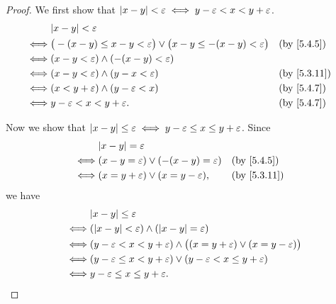 \begin{proof}
  We first show that \(\left\lvert x - y\right\rvert < \varepsilon \iff y - \varepsilon < x < y + \varepsilon\).
  \begin{align*}
         & \abs{x - y} < \varepsilon                                                                                     \\
    \iff & \big(-(x - y) \leq x - y < \varepsilon\big) \lor \big(x - y \leq -(x - y) < \varepsilon\big) &  & \by{5.4.5}  \\
    \iff & (x - y < \varepsilon) \land (-(x - y) < \varepsilon)                                                          \\
    \iff & (x - y < \varepsilon) \land (y - x < \varepsilon)                                            &  & \by{5.3.11} \\
    \iff & (x < y + \varepsilon) \land (y - \varepsilon < x)                                            &  & \by{5.4.7}  \\
    \iff & y - \varepsilon < x < y + \varepsilon.                                                       &  & \by{5.4.7}
  \end{align*}

  Now we show that \(\left\lvert x - y\right\rvert \leq \varepsilon \iff y - \varepsilon \leq x \leq y + \varepsilon\).
  Since
  \begin{align*}
         & \abs{x - y} = \varepsilon                                            \\
    \iff & (x - y = \varepsilon) \lor (-(x - y) = \varepsilon) &  & \by{5.4.5}  \\
    \iff & (x = y + \varepsilon) \lor (x = y - \varepsilon),   &  & \by{5.3.11}
  \end{align*}
  we have
  \begin{align*}
         & \abs{x - y} \leq \varepsilon                                                                             \\
    \iff & (\abs{x - y} < \varepsilon) \land (\abs{x - y} = \varepsilon)                                            \\
    \iff & (y - \varepsilon < x < y + \varepsilon) \land \big((x = y + \varepsilon) \lor (x = y - \varepsilon)\big) \\
    \iff & (y - \varepsilon \leq x < y + \varepsilon) \lor (y - \varepsilon < x \leq y + \varepsilon)               \\
    \iff & y - \varepsilon \leq x \leq y + \varepsilon.
  \end{align*}
\end{proof}

